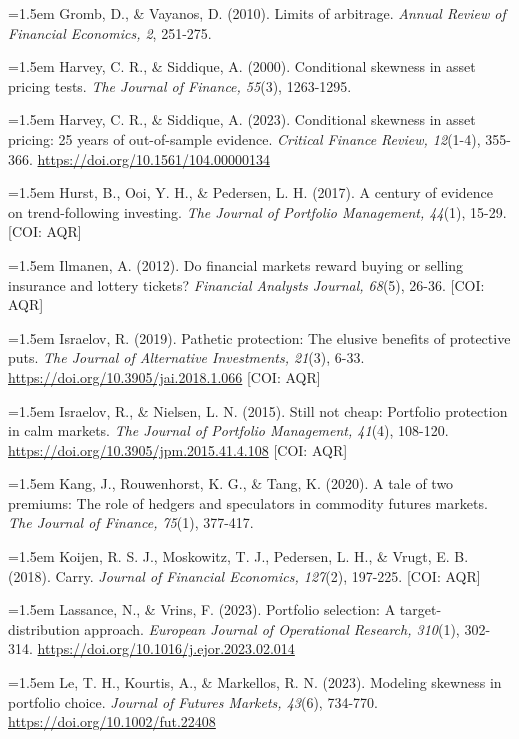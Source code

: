 \documentclass[12pt, a4paper]{article}
\begin{document}
\hangindent=1.5em
Gromb, D., \& Vayanos, D. (2010). Limits of arbitrage. \emph{Annual
Review of Financial Economics, 2}, 251-275.

\hangindent=1.5em
Harvey, C. R., \& Siddique, A. (2000). Conditional skewness in asset
pricing tests. \emph{The Journal of Finance, 55}(3), 1263-1295.

\hangindent=1.5em
Harvey, C. R., \& Siddique, A. (2023). Conditional skewness in asset
pricing: 25 years of out-of-sample evidence. \emph{Critical Finance
Review, 12}(1-4), 355-366. \url{https://doi.org/10.1561/104.00000134}

\hangindent=1.5em
Hurst, B., Ooi, Y. H., \& Pedersen, L. H. (2017). A century of evidence
on trend-following investing. \emph{The Journal of Portfolio Management,
44}(1), 15-29. {[}COI: AQR{]}

\hangindent=1.5em
Ilmanen, A. (2012). Do financial markets reward buying or selling
insurance and lottery tickets? \emph{Financial Analysts Journal, 68}(5),
26-36. {[}COI: AQR{]}

\hangindent=1.5em
Israelov, R. (2019). Pathetic protection: The elusive benefits of
protective puts. \emph{The Journal of Alternative Investments, 21}(3),
6-33. \url{https://doi.org/10.3905/jai.2018.1.066} {[}COI: AQR{]}

\hangindent=1.5em
Israelov, R., \& Nielsen, L. N. (2015). Still not cheap: Portfolio
protection in calm markets. \emph{The Journal of Portfolio Management,
41}(4), 108-120. \url{https://doi.org/10.3905/jpm.2015.41.4.108} {[}COI:
AQR{]}

\hangindent=1.5em
Kang, J., Rouwenhorst, K. G., \& Tang, K. (2020). A tale of two
premiums: The role of hedgers and speculators in commodity futures
markets. \emph{The Journal of Finance, 75}(1), 377-417.

\hangindent=1.5em
Koijen, R. S. J., Moskowitz, T. J., Pedersen, L. H., \& Vrugt, E. B.
(2018). Carry. \emph{Journal of Financial Economics, 127}(2), 197-225.
{[}COI: AQR{]}

\hangindent=1.5em
Lassance, N., \& Vrins, F. (2023). Portfolio selection: A
target-distribution approach. \emph{European Journal of Operational
Research, 310}(1), 302-314. \url{https://doi.org/10.1016/j.ejor.2023.02.014}

\hangindent=1.5em
Le, T. H., Kourtis, A., \& Markellos, R. N. (2023). Modeling skewness in
portfolio choice. \emph{Journal of Futures Markets, 43}(6), 734-770.
\url{https://doi.org/10.1002/fut.22408}
\end{document}
